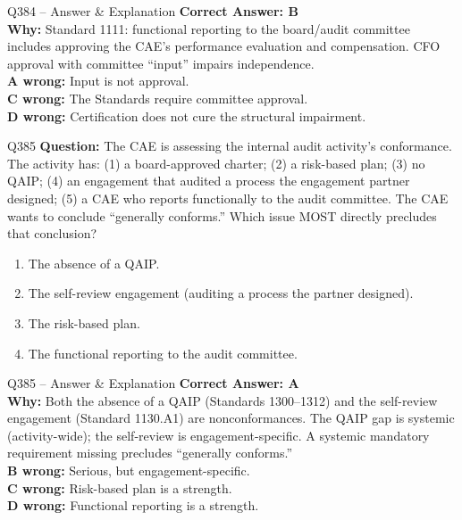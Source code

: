 \documentclass[aspectratio=169,10pt]{beamer}
\begin{document}
	\begin{frame}[t]{Q384 -- Answer \& Explanation}
		\small
		\textbf{Correct Answer: B} \\[4pt]
		\textbf{Why:} Standard 1111: functional reporting to the board/audit committee includes approving the CAE's performance evaluation and compensation. CFO approval with committee ``input'' impairs independence. \\[4pt]
		\textbf{A wrong:} Input is not approval. \\[2pt]
		\textbf{C wrong:} The Standards require committee approval. \\[2pt]
		\textbf{D wrong:} Certification does not cure the structural impairment.
	\end{frame}
	
	
	\begin{frame}[t]{Q385}
		\small
		\textbf{Question:} The CAE is assessing the internal audit activity's conformance. The activity has: (1) a board-approved charter; (2) a risk-based plan; (3) no QAIP; (4) an engagement that audited a process the engagement partner designed; (5) a CAE who reports functionally to the audit committee. The CAE wants to conclude ``generally conforms.'' Which issue MOST directly precludes that conclusion?
		\begin{enumerate}[label=\Alph*.,itemsep=1pt,topsep=2pt]
			\item The absence of a QAIP.
			\item The self-review engagement (auditing a process the partner designed).
			\item The risk-based plan.
			\item The functional reporting to the audit committee.
		\end{enumerate}
	\end{frame}
	
	\begin{frame}[t]{Q385 -- Answer \& Explanation}
		\small
		\textbf{Correct Answer: A} \\[4pt]
		\textbf{Why:} Both the absence of a QAIP (Standards 1300–1312) and the self-review engagement (Standard 1130.A1) are nonconformances. The QAIP gap is systemic (activity-wide); the self-review is engagement-specific. A systemic mandatory requirement missing precludes ``generally conforms.'' \\[4pt]
		\textbf{B wrong:} Serious, but engagement-specific. \\[2pt]
		\textbf{C wrong:} Risk-based plan is a strength. \\[2pt]
		\textbf{D wrong:} Functional reporting is a strength.
	\end{frame}
	
\end{document}
